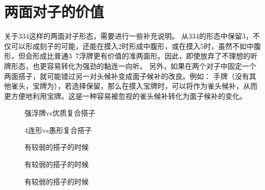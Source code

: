 \section{两面对子的价值}
关于334这样的两面对子形态，需要进行一些补充说明。
从334的形态中保留3，不仅可以形成刻子的可能，还能在摸入2时形成中腹形，或在摸入5时，虽然不如中腹形，但会形成比普通3~7浮牌更有价值的准两面形。因此，即使放弃了不理想的听牌形态，也更容易转化为强劲的黏连一向听。
另外，如果在两个对子中固定一个两面搭子，就可能错过另一对头候补变成面子候补的改良。例如：
手牌（没有其他雀头，宝牌为），若选择保留，那么在摸入宝牌时，可以将作为雀头候补，从而更方便地利用宝牌。这是一种容易被忽视的雀头候补转化为面子候补的变化。
\begin{figure}[h]
    \caption{强浮牌vs优质复合搭子}
    \label{lec8:pai17}
\end{figure}

\begin{figure}[h]
    \caption{4连形vs愚形复合搭子}
    \label{lec8:pai18-20}
    \par\bigskip
    \par\bigskip
\end{figure}

\begin{figure}[h]
    \caption{有较弱的搭子的时候}
    \label{lec8:pai21}
\end{figure}

\begin{figure}[h]
    \caption{有较弱的搭子的时候}
    \label{lec8:pai22}
\end{figure}

\begin{figure}[h]
    \caption{有较弱的搭子的时候}
    \label{lec8:pai23}
\end{figure}


